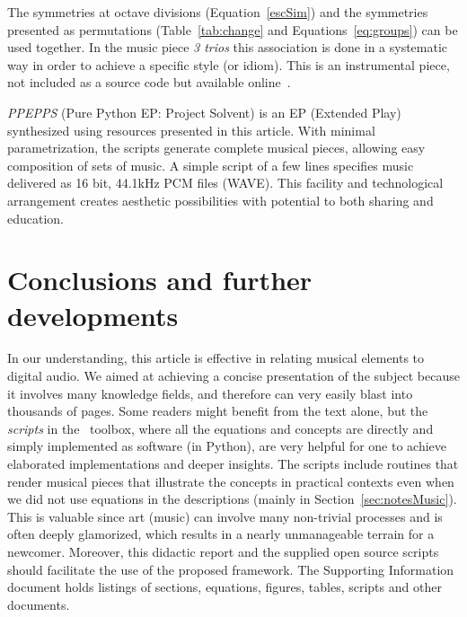 The symmetries at octave divisions (Equation~\ref{escSim}) and the
symmetries presented as permutations (Table~\ref{tab:change} and
Equations~\ref{eq:groups}) can be used together. In the music piece \emph{3 trios}
this association is done in a systematic way in order to achieve a specific style (or idiom).
This is an instrumental piece, not included as a source
code but available online~\cite{3Trios}.

\emph{PPEPPS} (Pure Python EP: Project Solvent) is an EP (Extended Play) synthesized using
resources presented in this article. With minimal parametrization, the scripts
generate complete musical pieces, allowing easy composition of sets of
music. A simple script of a few lines specifies music delivered as 16 bit,
44.1kHz PCM files (WAVE). This facility and technological
arrangement creates aesthetic possibilities with potential to both
sharing and education.

\section{Conclusions and further developments}
\label{cap:conclusao}
In our understanding,
this article is effective in relating musical elements to digital audio.
We aimed at achieving a concise presentation of the subject because it involves many knowledge fields, and therefore can very easily blast into thousands of pages.
Some readers might benefit from the text alone, but the \emph{scripts} in the \massa\ toolbox, where all the equations and concepts are directly and simply implemented as software (in Python),
are very helpful for one to achieve elaborated implementations and deeper insights.
The scripts include routines that render musical pieces that illustrate the concepts in practical contexts
even when we did not use equations in the descriptions (mainly in Section~\ref{sec:notesMusic}).
This is valuable since art (music) can involve many non-trivial processes and is often deeply glamorized, which results in a nearly unmanageable terrain for a newcomer.
Moreover, this didactic report and the supplied open source scripts should facilitate the use of the proposed framework.
The Supporting Information document holds listings of sections, equations, figures, tables, scripts and other documents.

